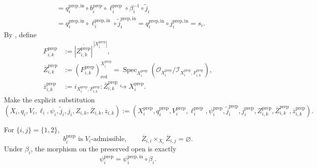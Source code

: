 \begin{definition}
\[\begin{aligned}
      &=q_i^{\mathrm{prep,in}}\circ b_i^{\mathrm{prep}}
          \circ\ell_i^{\mathrm{prep}}
          \circ\beta_i^{-1}\circ\widetilde j_i\\
      &=q_i^{\mathrm{prep,in}}\circ\ell_i^{\mathrm{prep,in}}
          \circ\widetilde j_i^{\mathrm{prep,in}}
       =q_i^{\mathrm{prep,in}}\circ j_i^{\mathrm{prep,in}}
       =s_i.
  \end{aligned}
  \]
  By , define
  \[
  \begin{aligned}
    F_{i,k}^{\mathrm{prep}}
      &:=\overline{|Z_{i,k}^{\mathrm{prep}}|}^{\,|X_i^{\mathrm{prep}}|},\\
    \overline Z_{i,k}^{\mathrm{prep}}
      &:=(F_{i,k}^{\mathrm{prep}})_{\mathrm{red}}^{X_i^{\mathrm{prep}}}
        =\operatorname{Spec}_{X_i^{\mathrm{prep}}}
          \!\left(\mathcal O_{X_i^{\mathrm{prep}}}/
            \mathcal I_{X_i^{\mathrm{prep}},F_{i,k}^{\mathrm{prep}}}\right),\\
    \overline z_{i,k}^{\mathrm{prep}}
      &:=i_{X_i^{\mathrm{prep}},F_{i,k}^{\mathrm{prep}}}
        \colon\overline Z_{i,k}^{\mathrm{prep}}
          \hookrightarrow X_i^{\mathrm{prep}}.
  \end{aligned}
  \]
  Make the explicit substitution
  \[
    (X_i,q_i,V_i,\ell_i,\psi_i,\widetilde j_i,j_i,
      Z_{i,k},\overline Z_{i,k},\overline z_{i,k})
      :=
    (X_i^{\mathrm{prep}},q_i^{\mathrm{prep}},
      V_i^{\mathrm{prep}},\ell_i^{\mathrm{prep}},
      \psi_i^{\mathrm{prep}},\widetilde j_i^{\mathrm{prep}},
      j_i^{\mathrm{prep}},
      Z_{i,k}^{\mathrm{prep}},\overline Z_{i,k}^{\mathrm{prep}},
      \overline z_{i,k}^{\mathrm{prep}}).
  \]
\end{definition}

\begin{lemma}
  \label{lemma:nagata-prepared-boundaries}

  For $\{i,j\}=\{1,2\}$,
  \[
    b_i^{\mathrm{prep}}\text{ is }V_i\text{-admissible},\qquad
    \overline Z_{i,i}\times_{X_i}\overline Z_{i,j}=\varnothing.
  \]
  Under $\beta_i$, the morphism on the preserved open is exactly
  \[
    \psi_i^{\mathrm{prep}}
      =\psi_i^{\mathrm{prep,in}}\circ\beta_i.
  \]
\end{lemma}


